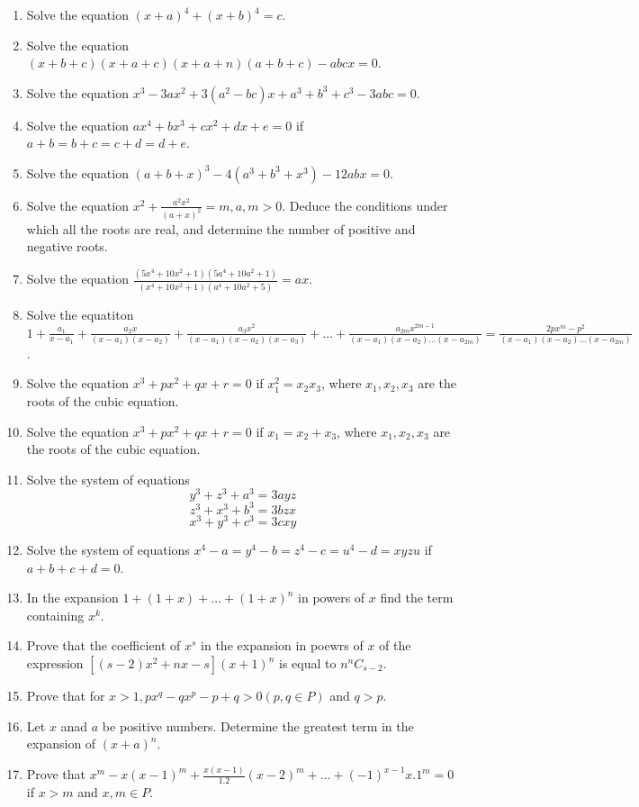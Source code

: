 \begin{enumerate}[resume]
\item Solve the equation $(x + a)^4 + (x + b)^4 = c$.
\item Solve the equation $(x + b + c)(x + a + c)(x + a + n)(a + b + c) - abcx = 0$.
\item Solve the equation $x^3 - 3ax^2 + 3(a^2 - bc)x + a^3 + b^3 + c^3 - 3abc = 0$.
\item Solve the equation $ax^4 + bx^3 + cx^2 + dx + e = 0$ if $a + b = b + c = c + d = d + e$.
\item Solve the equation $(a + b + x)^3 - 4(a^3 + b^3 + x^3) - 12abx = 0$.
\item Solve the equation $x^2 + \frac{a^2x^2}{(a + x)^2} = m, a, m > 0$. Deduce the conditions under which all the roots are real,
  and determine the number of positive and negative roots.
\item Solve the equation $\frac{(5x^4 + 10x^2 + 1)(5a^4 + 10a^2 + 1)}{(x^4 + 10x^2 +1)(a^4 + 10a^2 + 5)} = ax$.
\item Solve the equatiton $1 + \frac{a_1}{x - a_1} + \frac{a_2x}{(x - a_1)(x - a_2)} + \frac{a_3x^2}{(x - a_1)(x - a_2)(x - a_3)} +
  \ldots + \frac{a_{2m}x^{2m - 1}}{(x - a_1)(x - a_2)\ldots(x - a_{2m})} = \frac{2px^m - p^2}{(x - a_1)(x - a_2) \ldots (x - a_{2m})}$.
\item Solve the equation $x^3 + px^2 + qx + r = 0$ if $x_1^2 = x_2x_3$, where $x_1, x_2, x_3$ are the roots of the cubic equation.
\item Solve the equation $x^3 + px^2 + qx + r = 0$ if $x_1 = x_2 + x_3$, where $x_1, x_2, x_3$ are the roots of the cubic equation.
\item Solve the system of equations
  $$y^3 + z^3 + a^3 = 3ayz$$
  $$z^3 + x^3 + b^3 = 3bzx$$
  $$x^3 + y^3 + c^3 = 3cxy$$
\item Solve the system of equations $x^4 - a = y^4 - b = z^4 - c = u^4 - d = xyzu$ if $a + b + c + d = 0$.
\item In the expansion $1 + (1 + x) + \ldots + (1 + x)^n$ in powers of $x$ find the term containing $x^k$.
\item Prove that the coefficient of $x^s$ in the expansion in poewrs of $x$ of the expression $[(s - 2)x^2 + nx - s](x + 1)^n$ is
  equal to $n{}^nC_{s - 2}$.
\item Prove that for $x>1, px^q - qx^p - p + q > 0 (p, q\in P)$ and $q > p$.
\item Let $x$ anad $a$ be positive numbers. Determine the greatest term in the expansion of $(x + a)^n$.
\item Prove that $x^m - x(x - 1)^m + \frac{x(x - 1)}{1.2}(x - 2)^m + \ldots + (-1)^{x - 1}x.1^m = 0$ if $x > m$ and $x,m\in P$.

\end{enumerate}
